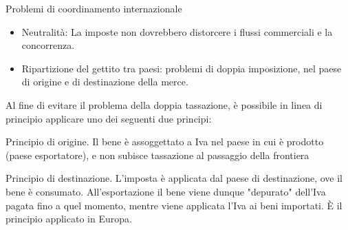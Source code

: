 \documentclass[aspectratio=64,11pt]{beamer}
\begin{document}
\begin{frame}{Problemi di coordinamento internazionale}

  \begin{itemize}
  \item \alert{Neutralità:} La imposte non dovrebbero distorcere i flussi
    commerciali e la concorrenza.
  \item \alert{Ripartizione del gettito tra paesi:} problemi di doppia
    imposizione, nel paese di origine e di destinazione della merce.
  \end{itemize}

  Al fine di evitare il problema della doppia tassazione, è possibile
  in linea di principio applicare uno dei seguenti due principi:
  \begin{block}{Principio di origine.} Il bene è assoggettato a Iva nel paese
    in cui è prodotto (paese esportatore), e non subisce tassazione al
    passaggio della frontiera
\end{block}
\begin{block}{Principio di destinazione.} L'imposta è applicata dal paese di
  destinazione, ove il bene è consumato.  All'esportazione il bene viene
  dunque "depurato" dell'Iva pagata fino a quel momento, mentre viene
  applicata l'Iva ai beni importati.  È il principio applicato in Europa.
\end{block}
\end{frame}
\end{document}
